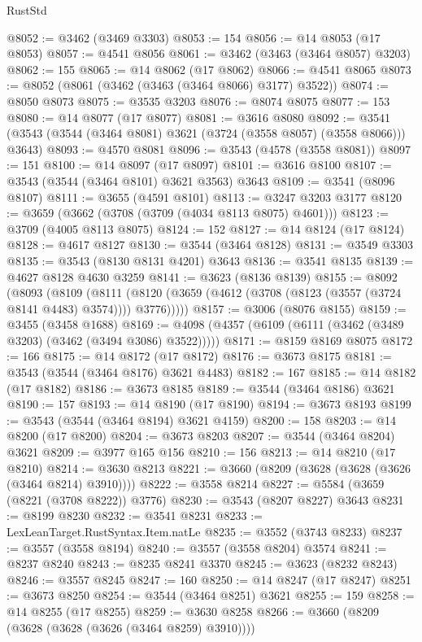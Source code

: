 \begin{lexlean}{RustStd}
\begin{coremodule}
@8052 := @3462 (@3469 @3303)
@8053 := 154
@8056 := @14 @8053 (@17 @8053)
@8057 := @4541 @8056
@8061 := @3462 (@3463 (@3464 @8057) @3203)
@8062 := 155
@8065 := @14 @8062 (@17 @8062)
@8066 := @4541 @8065
@8073 := @8052 (@8061 (@3462 (@3463 (@3464 @8066) @3177) @3522))
@8074 := @8050 @8073
@8075 := @3535 @3203
@8076 := @8074 @8075
@8077 := 153
@8080 := @14 @8077 (@17 @8077)
@8081 := @3616 @8080
@8092 := @3541 (@3543 (@3544 (@3464 @8081) @3621 (@3724 (@3558 @8057) (@3558 @8066))) @3643)
@8093 := @4570 @8081
@8096 := @3543 (@4578 (@3558 @8081))
@8097 := 151
@8100 := @14 @8097 (@17 @8097)
@8101 := @3616 @8100
@8107 := @3543 (@3544 (@3464 @8101) @3621 @3563) @3643
@8109 := @3541 (@8096 @8107)
@8111 := @3655 (@4591 @8101)
@8113 := @3247 @3203 @3177
@8120 := @3659 (@3662 (@3708 (@3709 (@4034 @8113 @8075) @4601)))
@8123 := @3709 (@4005 @8113 @8075)
@8124 := 152
@8127 := @14 @8124 (@17 @8124)
@8128 := @4617 @8127
@8130 := @3544 (@3464 @8128)
@8131 := @3549 @3303
@8135 := @3543 (@8130 @8131 @4201) @3643
@8136 := @3541 @8135
@8139 := @4627 @8128 @4630 @3259
@8141 := @3623 (@8136 @8139)
@8155 := @8092
    (@8093
      (@8109
        (@8111 (@8120 (@3659 (@4612 (@3708 (@8123 (@3557 (@3724 @8141 @4483) @3574)))) @3776)))))
@8157 := @3006 (@8076 @8155)
@8159 := @3455 (@3458 @1688)
@8169 := @4098 (@4357 (@6109 (@6111 (@3462 (@3489 @3203) (@3462 (@3494 @3086) @3522)))))
@8171 := @8159 @8169 @8075
@8172 := 166
@8175 := @14 @8172 (@17 @8172)
@8176 := @3673 @8175
@8181 := @3543 (@3544 (@3464 @8176) @3621 @4483)
@8182 := 167
@8185 := @14 @8182 (@17 @8182)
@8186 := @3673 @8185
@8189 := @3544 (@3464 @8186) @3621
@8190 := 157
@8193 := @14 @8190 (@17 @8190)
@8194 := @3673 @8193
@8199 := @3543 (@3544 (@3464 @8194) @3621 @4159)
@8200 := 158
@8203 := @14 @8200 (@17 @8200)
@8204 := @3673 @8203
@8207 := @3544 (@3464 @8204) @3621
@8209 := @3977 @165 @156
@8210 := 156
@8213 := @14 @8210 (@17 @8210)
@8214 := @3630 @8213
@8221 := @3660 (@8209 (@3628 (@3628 (@3626 (@3464 @8214) @3910))))
@8222 := @3558 @8214
@8227 := @5584 (@3659 (@8221 (@3708 @8222)) @3776)
@8230 := @3543 (@8207 @8227) @3643
@8231 := @8199 @8230
@8232 := @3541 @8231
@8233 := LexLeanTarget.RustSyntax.Item.natLe
@8235 := @3552 (@3743 @8233)
@8237 := @3557 (@3558 @8194)
@8240 := @3557 (@3558 @8204) @3574
@8241 := @8237 @8240
@8243 := @8235 @8241 @3370
@8245 := @3623 (@8232 @8243)
@8246 := @3557 @8245
@8247 := 160
@8250 := @14 @8247 (@17 @8247)
@8251 := @3673 @8250
@8254 := @3544 (@3464 @8251) @3621
@8255 := 159
@8258 := @14 @8255 (@17 @8255)
@8259 := @3630 @8258
@8266 := @3660 (@8209 (@3628 (@3628 (@3626 (@3464 @8259) @3910))))

\end{coremodule}
\end{lexlean}
